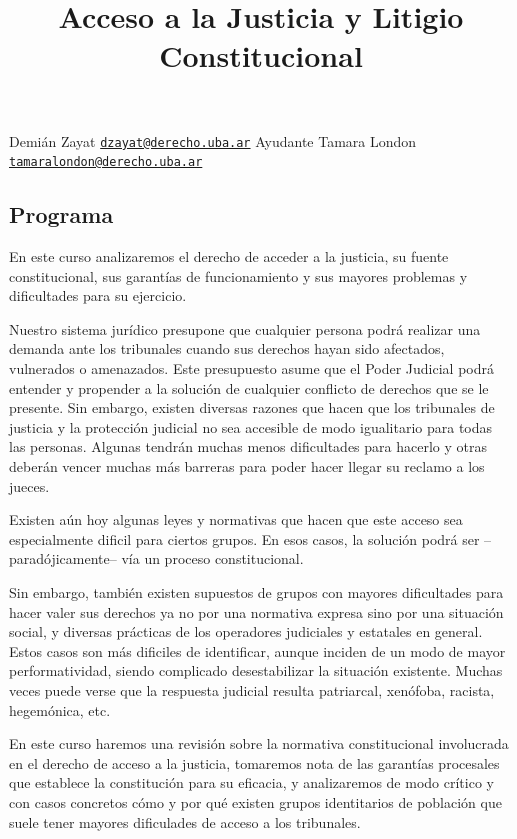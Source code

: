 \documentclass[
]{article}
\title{Acceso a la Justicia y Litigio Constitucional}
\author{}
\date{\vspace{-2.5em}}
\begin{document}
\maketitle

Demián Zayat
\href{mailto:dzayat@derecho.uba.ar}{\nolinkurl{dzayat@derecho.uba.ar}}
Ayudante Tamara London
\href{mailto:tamaralondon@derecho.uba.ar}{\nolinkurl{tamaralondon@derecho.uba.ar}}

\subsection{Programa}\label{programa}

En este curso analizaremos el derecho de acceder a la justicia, su
fuente constitucional, sus garantías de funcionamiento y sus mayores
problemas y dificultades para su ejercicio.

Nuestro sistema jurídico presupone que cualquier persona podrá realizar
una demanda ante los tribunales cuando sus derechos hayan sido
afectados, vulnerados o amenazados. Este presupuesto asume que el Poder
Judicial podrá entender y propender a la solución de cualquier conflicto
de derechos que se le presente. Sin embargo, existen diversas razones
que hacen que los tribunales de justicia y la protección judicial no sea
accesible de modo igualitario para todas las personas. Algunas tendrán
muchas menos dificultades para hacerlo y otras deberán vencer muchas más
barreras para poder hacer llegar su reclamo a los jueces.

Existen aún hoy algunas leyes y normativas que hacen que este acceso sea
especialmente dificil para ciertos grupos. En esos casos, la solución
podrá ser --paradójicamente-- vía un proceso constitucional.

Sin embargo, también existen supuestos de grupos con mayores
dificultades para hacer valer sus derechos ya no por una normativa
expresa sino por una situación social, y diversas prácticas de los
operadores judiciales y estatales en general. Estos casos son más
dificiles de identificar, aunque inciden de un modo de mayor
performatividad, siendo complicado desestabilizar la situación
existente. Muchas veces puede verse que la respuesta judicial resulta
patriarcal, xenófoba, racista, hegemónica, etc.

En este curso haremos una revisión sobre la normativa constitucional
involucrada en el derecho de acceso a la justicia, tomaremos nota de las
garantías procesales que establece la constitución para su eficacia, y
analizaremos de modo crítico y con casos concretos cómo y por qué
existen grupos identitarios de población que suele tener mayores
dificulades de acceso a los tribunales.
\end{document}
